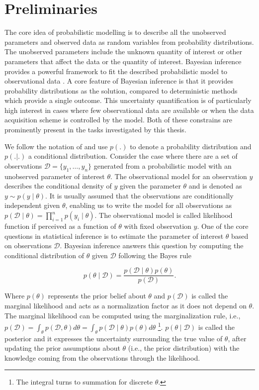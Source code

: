 \documentclass[dissertation,math,vertlayout,pdfa,colorlinks]{aaltoseries}
\newcommand{\bD}{\mathcal{D}}
\begin{document}
\section{Preliminaries}
The core idea of probabilistic modelling is to describe all the unobserved parameters and observed data as random variables from probability distributions. The unobserved parameters include the unknown quantity of interest or other parameters that affect the data or the quantity of interest. Bayesian inference provides a powerful framework to fit the described probabilistic model to observational data \cite{Gelman2013}. A core feature of Bayesian inference is that it provides probability distributions as the solution, compared to deterministic methods which provide a single outcome. This uncertainty quantification is of particularly high interest in cases where few observational data are available or when the data acquisition scheme is controlled by the model. Both of these constrains are prominently present in the tasks investigated by this thesis.

We follow the notation of \cite{Gelman2013} and use $p(.)$ to denote a probability distribution and $p(.|.)$ a conditional distribution. Consider the case where there are a set of observations $\bD= \{y_1,\ldots,y_n\}$ generated from a probabilistic model with an unobserved parameter of interest $\theta$. The observational model for an observation $y$ describes the conditional density of $y$ given the parameter $\theta$ and is denoted as $y \sim p(y \mid \theta)$. It is usually assumed that the observations are conditionally independent given $\theta$, enabling us to write the model for all observations as $p(\bD \mid \theta) =  \prod_{i=1}^{n} p(y_i \mid \theta)$. The observational model is called likelihood function if perceived as a function of $\theta$ with fixed observation $y$. One of the core questions in statistical inference is to estimate the parameter of interest $\theta$ based on observations $\bD$. %
Bayesian inference answers this question by computing the conditional distribution of $\theta$ given $\bD$ following the Bayes rule


\begin{equation}\label{Eq:Bayes}
p(\theta \mid \bD) = \frac{p(\bD \mid \theta)p(\theta)}{p(\bD)}.
\end{equation}  

Where $p(\theta)$ represents the prior belief about $\theta$ and $p(\bD)$ is called the marginal likelihood and acts as a normalization factor as it does not depend on $\theta$. The marginal likelihood can be computed using the marginalization rule, i.e., $p(\bD)= \int_{\theta} p(\bD, \theta)d\theta= \int_{\theta} p(\bD \mid \theta)p(\theta) d\theta$ \footnote{The integral turns to summation for discrete $\theta$.}. $p(\theta \mid \bD)$ is called the posterior and it expresses the uncertainty surrounding the true value of $\theta$, after updating the prior assumptions about $\theta$ (i.e., the prior distribution) with the knowledge coming from the observations through the likelihood.  
\end{document}
